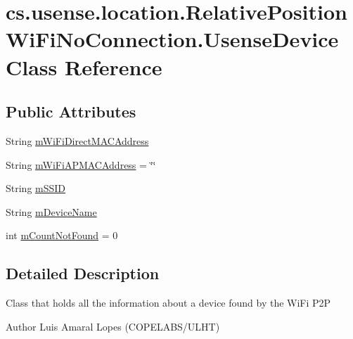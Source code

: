 \hypertarget{classcs_1_1usense_1_1location_1_1_relative_position_wi_fi_no_connection_1_1_usense_device}{}\section{cs.\+usense.\+location.\+Relative\+Position\+Wi\+Fi\+No\+Connection.\+Usense\+Device Class Reference}
\label{classcs_1_1usense_1_1location_1_1_relative_position_wi_fi_no_connection_1_1_usense_device}
\subsection*{Public Attributes}
\begin{DoxyCompactItemize}
\item 
String \hyperlink{classcs_1_1usense_1_1location_1_1_relative_position_wi_fi_no_connection_1_1_usense_device_a1f976f414772190a1ff3d33b49f66769}{m\+Wi\+Fi\+Direct\+M\+A\+C\+Address}
\item 
String \hyperlink{classcs_1_1usense_1_1location_1_1_relative_position_wi_fi_no_connection_1_1_usense_device_a47ea636fbb53413cc89ea02cb4a3b327}{m\+Wi\+Fi\+A\+P\+M\+A\+C\+Address} = \char`\"{}\char`\"{}
\item 
String \hyperlink{classcs_1_1usense_1_1location_1_1_relative_position_wi_fi_no_connection_1_1_usense_device_ac2ce75dfa49d63e67451e02d13e86de9}{m\+S\+S\+I\+D}
\item 
String \hyperlink{classcs_1_1usense_1_1location_1_1_relative_position_wi_fi_no_connection_1_1_usense_device_a7e6f04708fc41118d33e750b79664510}{m\+Device\+Name}
\item 
int \hyperlink{classcs_1_1usense_1_1location_1_1_relative_position_wi_fi_no_connection_1_1_usense_device_a567b4444be2fdf661f8b617aa6c1f392}{m\+Count\+Not\+Found} = 0
\end{DoxyCompactItemize}


\subsection{Detailed Description}
Class that holds all the information about a device found by the Wi\+Fi P2\+P \begin{DoxyAuthor}{Author}
Luis Amaral Lopes (C\+O\+P\+E\+L\+A\+B\+S/\+U\+L\+H\+T) 
\end{DoxyAuthor}


